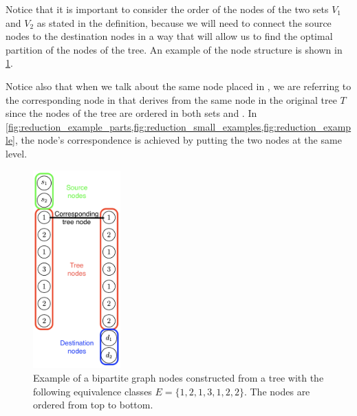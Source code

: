 
Notice that it is important to consider the order of the nodes of the two sets $V_1$ and $V_2$ as stated in the definition, because we will need to connect the source nodes to the destination nodes in a way that will allow us to find the optimal partition of the nodes of the tree. An example of the node structure is shown in \cref{fig:reduction_example_parts}.

Notice also that when we talk about the same  node placed in , we are referring to the corresponding node in  that derives from the same node in the original tree $T$ since the nodes of the tree are ordered in both sets  and . In  \cref{fig:reduction_example_parts,fig:reduction_small_examples,fig:reduction_example}, the node's correspondence is achieved by putting the two nodes at the same level.

\begin{figure}[H]
    \centering
    \includegraphics[width=0.3\textwidth]{Immagini/bipartite_keys_part.png}
    \caption[Bipartite nodes structure]{Example of a bipartite graph nodes constructed from a tree with the following equivalence classes $E = \{1,2,1,3,1,2,2\}$. The nodes are ordered from top to bottom. }
    \label{fig:reduction_example_parts}
\end{figure}

